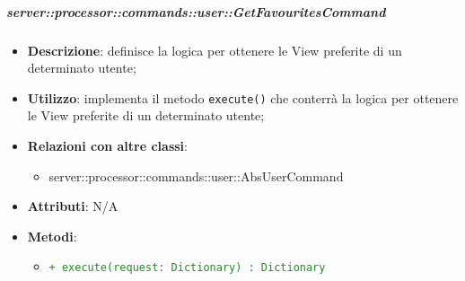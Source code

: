         \subparagraph{server::processor::commands::user::GetFavouritesCommand} %
        \label{subp:bdsm_app_server_processor_commands_user_getfavouritescommand}
        \begin{itemize}
          \item \textbf{Descrizione}: definisce la logica per ottenere le View preferite di un determinato utente;
          \item \textbf{Utilizzo}: implementa il metodo \texttt{execute()} che conterrà la logica per ottenere le View preferite di un determinato utente;
          \item \textbf{Relazioni con altre classi}:
            \begin{itemize}
              \item server::processor::commands::user::AbsUserCommand
            \end{itemize}
          \item \textbf{Attributi}: N/A
          \item \textbf{Metodi}:
          \begin{itemize}
              \item \textcolor{forestgreen}{\texttt{+ execute(request: Dictionary) : Dictionary}}
          \end{itemize}
        \end{itemize}

